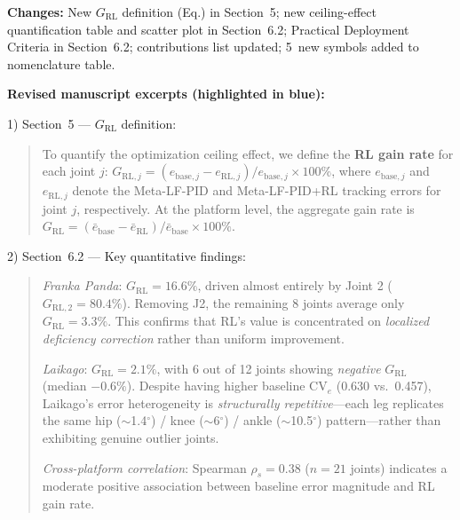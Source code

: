 \documentclass[11pt,a4paper]{article}
\begin{document}
\textbf{Changes:} New $G_{\mathrm{RL}}$ definition (Eq.) in Section~5; new ceiling-effect quantification table and scatter plot in Section~6.2; Practical Deployment Criteria in Section~6.2; contributions list updated; 5~new symbols added to nomenclature table.

\textbf{Revised manuscript excerpts (highlighted in blue):}

1) Section~5 --- $G_{\mathrm{RL}}$ definition:
\begin{quote}\color{blue}\small
To quantify the optimization ceiling effect, we define the \textbf{RL gain rate} for each joint $j$:
$G_{\mathrm{RL},j} = (e_{\mathrm{base},j} - e_{\mathrm{RL},j}) / e_{\mathrm{base},j} \times 100\%$,
where $e_{\mathrm{base},j}$ and $e_{\mathrm{RL},j}$ denote the Meta-LF-PID and Meta-LF-PID+RL tracking errors for joint $j$, respectively. At the platform level, the aggregate gain rate is $G_{\mathrm{RL}} = (\bar{e}_{\mathrm{base}} - \bar{e}_{\mathrm{RL}}) / \bar{e}_{\mathrm{base}} \times 100\%$.
\end{quote}

2) Section~6.2 --- Key quantitative findings:
\begin{quote}\color{blue}\small
\textit{Franka Panda}: $G_{\mathrm{RL}} = 16.6\%$, driven almost entirely by Joint 2 ($G_{\mathrm{RL},2} = 80.4\%$). Removing J2, the remaining 8 joints average only $G_{\mathrm{RL}} = 3.3\%$. This confirms that RL's value is concentrated on \textit{localized deficiency correction} rather than uniform improvement.

\textit{Laikago}: $G_{\mathrm{RL}} = 2.1\%$, with 6 out of 12 joints showing \textit{negative} $G_{\mathrm{RL}}$ (median $-0.6\%$). Despite having higher baseline $\mathrm{CV}_e$ (0.630 vs.\ 0.457), Laikago's error heterogeneity is \textit{structurally repetitive}---each leg replicates the same hip ($\sim$1.4$^\circ$) / knee ($\sim$6$^\circ$) / ankle ($\sim$10.5$^\circ$) pattern---rather than exhibiting genuine outlier joints.

\textit{Cross-platform correlation}: Spearman $\rho_s = 0.38$ ($n = 21$ joints) indicates a moderate positive association between baseline error magnitude and RL gain rate.
\end{quote}
\end{document}
